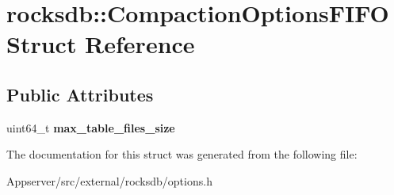 \hypertarget{structrocksdb_1_1CompactionOptionsFIFO}{}\section{rocksdb\+:\+:Compaction\+Options\+F\+I\+FO Struct Reference}
\label{structrocksdb_1_1CompactionOptionsFIFO}
\subsection*{Public Attributes}
\begin{DoxyCompactItemize}
\item 
uint64\+\_\+t {\bfseries max\+\_\+table\+\_\+files\+\_\+size}\hypertarget{structrocksdb_1_1CompactionOptionsFIFO_a54a997cb1d9a8d3b7eb2b6edbf5ccf42}{}\label{structrocksdb_1_1CompactionOptionsFIFO_a54a997cb1d9a8d3b7eb2b6edbf5ccf42}

\end{DoxyCompactItemize}


The documentation for this struct was generated from the following file\+:\begin{DoxyCompactItemize}
\item 
Appserver/src/external/rocksdb/options.\+h\end{DoxyCompactItemize}
